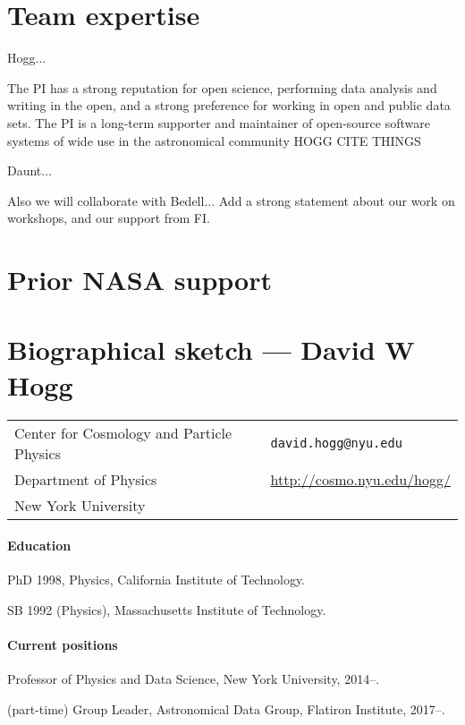 \documentclass[12pt]{article}
\begin{document}
\section{Team expertise}

Hogg...

The PI has a strong reputation for open science, performing data analysis and writing in the open, and a strong preference for working in open and public data sets. The PI is a long-term supporter and maintainer of open-source software systems of wide use in the astronomical community HOGG CITE THINGS

Daunt...

Also we will collaborate with Bedell... Add a strong statement about our work on workshops, and our support from FI.

\section{Prior NASA support}

\clearpage
\section{Biographical sketch --- David W Hogg}

\setlength{\tabcolsep}{0em}
\begin{tabular}{lll}
Center for Cosmology and Particle Physics & \hspace{6em} & \texttt{david.hogg@nyu.edu} \\
Department of Physics                     & & \url{http://cosmo.nyu.edu/hogg/} \\
New York University                       & & 
\end{tabular}

\paragraph{Education}
\begin{list}{}{\hogglist}
\item
PhD 1998, Physics, California Institute of Technology.
\item
SB 1992 (Physics), Massachusetts Institute of Technology.
\end{list}

\paragraph{Current positions}
\begin{list}{}{\hogglist}
\item
Professor of Physics and Data Science, New York University, 2014--.
\item
(part-time) Group Leader, Astronomical Data Group, Flatiron Institute, 2017--.
\end{list}
\end{document}
